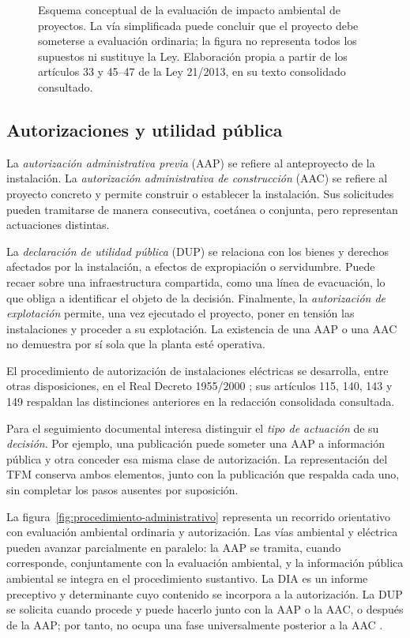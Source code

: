 \begin{figure}[p]
\centering

\caption[EIA ordinaria y simplificada]{Esquema conceptual de la evaluación de
impacto ambiental de proyectos. La vía simplificada puede concluir que el
proyecto debe someterse a evaluación ordinaria; la figura no representa todos
los supuestos ni sustituye la Ley. Elaboración propia a partir de los
artículos 33 y 45--47 de la Ley 21/2013, en su texto consolidado consultado.}
\label{fig:eia-ordinaria-simplificada}
\end{figure}

\subsection{Autorizaciones y utilidad pública}
La \emph{autorización administrativa previa} (AAP) se refiere al anteproyecto
de la instalación. La \emph{autorización administrativa de construcción}
(AAC) se refiere al proyecto concreto y permite construir o establecer la
instalación. Sus solicitudes pueden tramitarse de manera consecutiva,
coetánea o conjunta, pero representan actuaciones distintas.

La \emph{declaración de utilidad pública} (DUP) se relaciona con los bienes
y derechos afectados por la instalación, a efectos de expropiación o
servidumbre. Puede recaer sobre una infraestructura compartida, como una
línea de evacuación, lo que obliga a identificar el objeto de la decisión.
Finalmente, la \emph{autorización de explotación} permite, una vez ejecutado
el proyecto, poner en tensión las instalaciones y proceder a su explotación.
La existencia de una AAP o una AAC no demuestra por sí sola que la planta
esté operativa.

El procedimiento de autorización de instalaciones eléctricas se desarrolla,
entre otras disposiciones, en el Real Decreto 1955/2000
\cite{ministeriodeeconomia_realdecreto1955_2000}; sus artículos 115,
140, 143 y 149 respaldan las distinciones anteriores en la redacción
consolidada consultada.

Para el seguimiento documental interesa distinguir el \emph{tipo de
actuación} de su \emph{decisión}. Por ejemplo, una publicación puede someter
una AAP a información pública y otra conceder esa misma clase de
autorización. La representación del TFM conserva ambos elementos, junto con la publicación
que respalda cada uno, sin completar los pasos ausentes por suposición.

La figura~\ref{fig:procedimiento-administrativo} representa un recorrido
orientativo con evaluación ambiental ordinaria y autorización. Las vías
ambiental y eléctrica pueden avanzar parcialmente en paralelo: la AAP se
tramita, cuando corresponde, conjuntamente con la evaluación ambiental, y la
información pública ambiental se integra en el procedimiento sustantivo. La
DIA es un informe preceptivo y determinante cuyo contenido se incorpora a la
autorización. La DUP se solicita cuando procede y puede hacerlo junto con la
AAP o la AAC, o después de la AAP; por tanto, no ocupa una fase universalmente
posterior a la AAC
\cite{jefaturadelestado_ley212013_2013,
jefaturadelestado_ley242013_2013,
ministeriodeeconomia_realdecreto1955_2000}.

